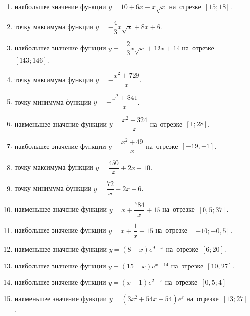\documentclass[a4paper,10pt]{article}
\begin{document}
\begin{enumerate}
\item {} наибольшее значение функции $y=10+6x -x\sqrt{x}$ на~отрезке~$\left[15;18\right]$.

\item {} точку максимума функции $y=-\dfrac{4}{3}x\sqrt{x} +8x+6$.

\item {} наибольшее значение функции $y=-\dfrac{2}{3}x\sqrt{x} +12x+14$ на~отрезке~$\left[143;146\right]$.

\item {} точку максимума функции $y=-\dfrac{x^2 +729}{x}$.

\item {} точку минимума функции $y=-\dfrac{x^2 +841}{x}$.

\item {} наименьшее значение функции $y=\dfrac{x^2 +324}{x}$ на~отрезке~$\left[1;28\right]$.

\item {} наибольшее значение функции $y=\dfrac{x^2 +49}{x}$ на~отрезке~$\left[-19;-1\right]$.

\item {} точку максимума функции $y=\dfrac{450}{x} +2x+10$.

\item {} точку минимума функции $y=\dfrac{72}{x} +2x+6$.

\item {} наименьшее значение функции $y=x+\dfrac{784}{x} +15$ на~отрезке~$\left[0,5;37\right]$.

\item {} наибольшее значение функции $y=x+\dfrac{1}{x} +15$ на~отрезке~$\left[-10;-0,5\right]$.

\item {} наименьшее значение функции $y=\left(8-x\right)e^{9-x}$ на~отрезке~$\left[6;20\right]$.

\item {} наибольшее значение функции $y=\left(15-x\right)e^{x-14}$ на~отрезке~$\left[10;27\right]$.

\item {} наибольшее значение функции $y=\left(x-1\right)e^{2-x}$ на~отрезке~$\left[0,5;4\right]$.

\item {} наименьшее значение функции $y=\left(3x^2 +54x -54\right)e^{x }$ на~отрезке~$\left[13;27\right]$.


\end{enumerate}
\end{document}
